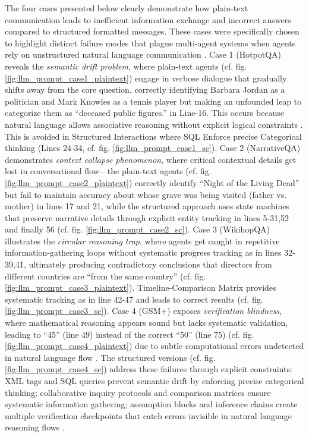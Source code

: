 The four cases presented below clearly demonstrate how plain-text communication leads to inefficient information exchange and incorrect answers compared to structured formatted messages. These cases were specifically chosen to highlight distinct failure modes that plague multi-agent systems when agents rely on unstructured natural language communication \cite{zhang2023emergent, li2023camel}. Case 1 (HotpotQA) reveals the \textit{semantic drift problem}, where plain-text agents (cf. fig. \ref{fig:llm_prompt_case1_plaintext}) engage in verbose dialogue that gradually shifts away from the core question, correctly identifying Barbara Jordan as a politician and Mark Knowles as a tennis player but making an unfounded leap to categorize them as ``deceased public figures.'' in Line-16. This occurs because natural language allows associative reasoning without explicit logical constraints \cite{wei2022chain}. This is avoided in Structured Interactions where SQL Enforce precise Categorical thinking (Lines 24-34, cf. fig. \ref{fig:llm_prompt_case1_sc}). Case 2 (NarrativeQA) demonstrates \textit{context collapse phenomenon}, where critical contextual details get lost in conversational flow---the plain-text agents (cf. fig. \ref{fig:llm_prompt_case2_plaintext}) correctly identify ``Night of the Living Dead'' but fail to maintain accuracy about whose grave was being visited (father vs. mother) in lines 17 and 21, while the structured approach uses state machines that preserve narrative details through explicit entity tracking in lines 5-31,52 and finally 56 (cf. fig. \ref{fig:llm_prompt_case2_sc}). Case 3 (WikihopQA) illustrates the \textit{circular reasoning trap}, where agents get caught in repetitive information-gathering loops without systematic progress tracking as in lines 32-39,41, ultimately producing contradictory conclusions that directors from different countries are ``from the same country'' \cite{react_iclr} (cf. fig. \ref{fig:llm_prompt_case3_plaintext}). Timeline-Comparison Matrix provides systematic tracking as in line 42-47 and leads to correct results (cf. fig. \ref{fig:llm_prompt_case3_sc}). Case 4 (GSM+) exposes \textit{verification blindness}, where mathematical reasoning appears sound but lacks systematic validation, leading to ``45'' (line 49) instead of the correct ``50'' (line 75) (cf. fig. \ref{fig:llm_prompt_case4_plaintext}) due to subtle computational errors undetected in natural language flow \cite{cobbe2021training}. The structured versions (cf. fig. \ref{fig:llm_prompt_case4_sc}) address these failures through explicit constraints: XML tags and SQL queries prevent semantic drift by enforcing precise categorical thinking; collaborative inquiry protocols and comparison matrices ensure systematic information gathering; assumption blocks and inference chains create multiple verification checkpoints that catch errors invisible in natural language reasoning flows \cite{schick2023toolformer, qin2023toolllm}.

